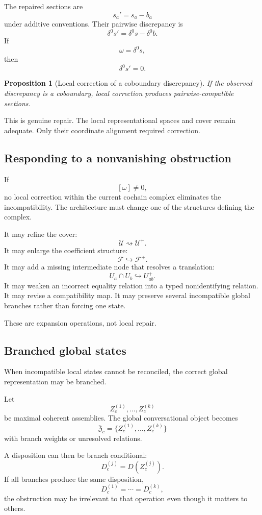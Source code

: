 \documentclass[11pt]{article}
\newtheorem{proposition}[definition]{Proposition}
\theoremstyle{definition}
\begin{document}
The repaired sections are
\[
s_a'
=
s_a-b_a
\]
under additive conventions. Their pairwise discrepancy is
\[
\delta^0s'
=
\delta^0s-\delta^0b.
\]
If
\[
\omega=\delta^0s,
\]
then
\[
\delta^0s'=0.
\]

\begin{proposition}[Local correction of a coboundary discrepancy]
If the observed discrepancy is a coboundary, local correction produces pairwise-compatible sections.
\end{proposition}

This is genuine repair. The local representational spaces and cover remain adequate. Only their coordinate alignment required correction.

\subsection{Responding to a nonvanishing obstruction}

If
\[
[\omega]\neq0,
\]
no local correction within the current cochain complex eliminates the incompatibility. The architecture must change one of the structures defining the complex.

It may refine the cover:
\[
\mathcal U\rightsquigarrow\mathcal U^{+}.
\]
It may enlarge the coefficient structure:
\[
\mathscr F\hookrightarrow\mathscr F^{+}.
\]
It may add a missing intermediate node that resolves a translation:
\[
U_a\cap U_b
\hookrightarrow
U_{ab}^{+}.
\]
It may weaken an incorrect equality relation into a typed nonidentifying relation. It may revise a compatibility map. It may preserve several incompatible global branches rather than forcing one state.

These are expansion operations, not local repair.

\subsection{Branched global states}

When incompatible local states cannot be reconciled, the correct global representation may be branched.

Let
\[
Z_c^{(1)},\ldots,Z_c^{(k)}
\]
be maximal coherent assemblies. The global conversational object becomes
\[
\mathfrak Z_c
=
\{Z_c^{(1)},\ldots,Z_c^{(k)}\}
\]
with branch weights or unresolved relations.

A disposition can then be branch conditional:
\[
D_c^{(j)}
=
D(Z_c^{(j)}).
\]
If all branches produce the same disposition,
\[
D_c^{(1)}
=
\cdots
=
D_c^{(k)},
\]
the obstruction may be irrelevant to that operation even though it matters to others.
\end{document}
